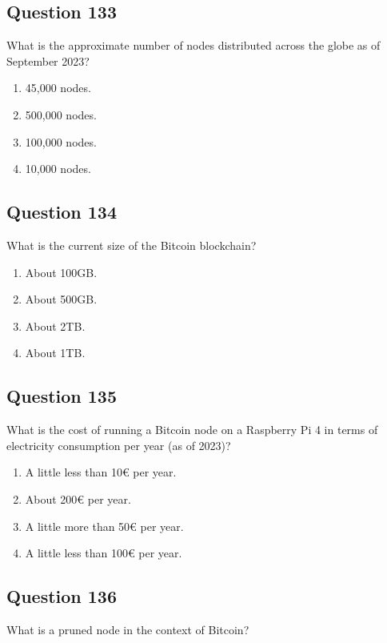 \documentclass[12pt,a4paper]{article}
\begin{document}
\bigskip


\subsection*{Question 133}
What is the approximate number of nodes distributed across the globe as of September 2023?

\begin{enumerate}[label=\Alph*., leftmargin=*]
\item 45,000 nodes.
\item 500,000 nodes.
\item 100,000 nodes.
\item 10,000 nodes.
\end{enumerate}

\bigskip


\subsection*{Question 134}
What is the current size of the Bitcoin blockchain?

\begin{enumerate}[label=\Alph*., leftmargin=*]
\item About 100GB.
\item About 500GB.
\item About 2TB.
\item About 1TB.
\end{enumerate}

\bigskip


\subsection*{Question 135}
What is the cost of running a Bitcoin node on a Raspberry Pi 4 in terms of electricity consumption per year (as of 2023)?

\begin{enumerate}[label=\Alph*., leftmargin=*]
\item A little less than 10€ per year.
\item About 200€ per year.
\item A little more than 50€ per year.
\item A little less than 100€ per year.
\end{enumerate}

\bigskip


\subsection*{Question 136}
What is a pruned node in the context of Bitcoin?
\end{document}
